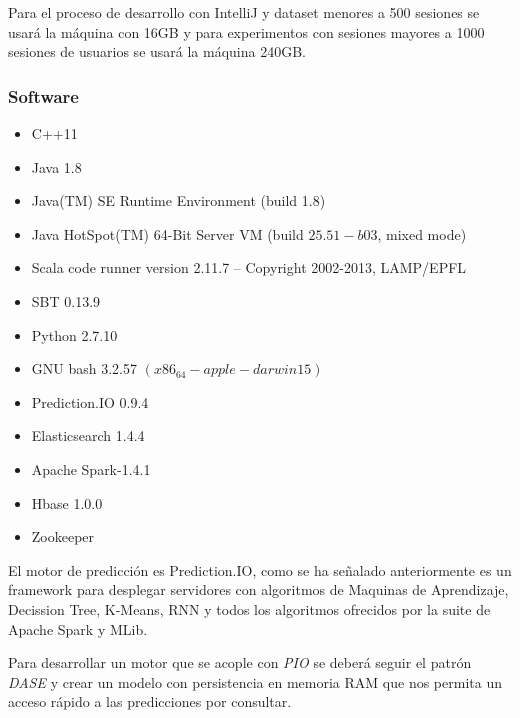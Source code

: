 Para el proceso de desarrollo con IntelliJ y dataset menores a 500 sesiones se usará la máquina con 16GB y para experimentos con sesiones mayores a 1000 sesiones de usuarios se usará la máquina 240GB.	
	

\subsubsection{Software}

	\begin{itemize}
		\item C++11
		\item Java  1.8
		\item Java(TM) SE Runtime Environment (build 1.8)
		\item Java HotSpot(TM) 64-Bit Server VM (build $25.51-b03$, mixed mode)
		\item Scala code runner version 2.11.7 -- Copyright 2002-2013, LAMP/EPFL
		\item SBT 0.13.9 
		\item Python 2.7.10
		\item GNU bash 3.2.57 $(x86_64-apple-darwin15)$
		\item Prediction.IO 0.9.4
		\item Elasticsearch 1.4.4	
		\item Apache Spark-1.4.1
		\item Hbase 1.0.0
		\item Zookeeper 
	\end{itemize}










El motor de predicción es Prediction.IO, como se ha señalado anteriormente  es un framework para desplegar servidores con algoritmos de Maquinas de Aprendizaje, Decission Tree, K-Means, RNN y todos los algoritmos ofrecidos por la suite de Apache Spark y MLib. %

Para desarrollar un motor que se acople con \emph{PIO} se deberá seguir el patrón \emph{DASE} y crear un modelo con persistencia en memoria RAM que nos permita un acceso rápido a las predicciones por consultar.


